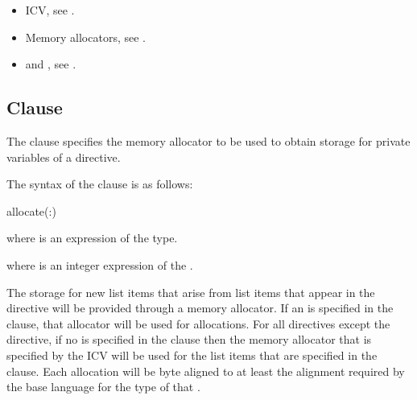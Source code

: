 \crossreferences
\begin{itemize}
\item {} ICV, see .

\item Memory allocators, see .

\item {} and , 
see .
\end{itemize}

\subsection{ Clause}
\label{subsec:allocate Clause}
\summary
The  clause specifies the memory allocator to be used to 
obtain storage for private variables of a directive.

\syntax

The syntax of the  clause is as follows:

\begin{ompSyntax}
allocate(\plc{[allocator}:\plc{] list})
\end{ompSyntax}

\begin{ccppspecific}
where  is an expression of the  type.
\end{ccppspecific}

\begin{fortranspecific}
where  is an integer expression of the  
.
\end{fortranspecific}

\descr

The storage for new list items that arise from list items that appear in the 
directive will be provided through a memory allocator. If an  
is specified in the clause, that allocator will be used for allocations. For 
all directives except the  directive, if no  is 
specified in the clause then the memory allocator that is specified by the 
 ICV will be used for the list items that are specified 
in the  clause. Each  allocation 
will be byte aligned to at least the alignment required by the
base language for the type of that .

